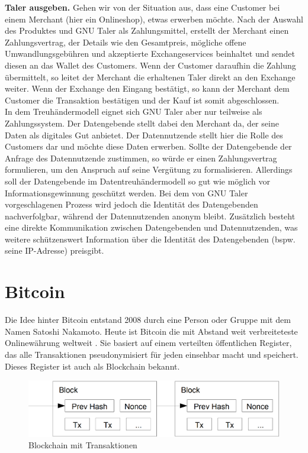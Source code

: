 \documentclass[11pt,a4paper]{scrreprt}
\begin{document}
\textbf{Taler ausgeben.} Gehen wir von der Situation aus, dass eine Customer bei einem Merchant (hier ein Onlineshop), etwas erwerben möchte. Nach der Auswahl des Produktes und GNU Taler als Zahlungsmittel, erstellt der Merchant einen Zahlungsvertrag, der Details wie den Gesamtpreis, mögliche offene Umwandlungsgebühren und akzeptierte Exchangeservices beinhaltet und sendet diesen an das Wallet des Customers.  Wenn der Customer daraufhin die Zahlung übermittelt, so leitet der Merchant die erhaltenen Taler direkt an den Exchange weiter. Wenn der Exchange den Eingang bestätigt, so kann der Merchant dem Customer die Transaktion bestätigen und der Kauf ist somit abgeschlossen.\\


In dem Treuhändermodell eignet sich GNU Taler aber nur teilweise als Zahlungssystem. Der Datengebende stellt dabei den Merchant da, der seine Daten als digitales Gut anbietet. Der Datennutzende stellt hier die Rolle des Customers dar und möchte diese Daten erwerben. Sollte der Datengebende der Anfrage des Datennutzende zustimmen, so würde er einen Zahlungsvertrag formulieren, um den Anspruch auf seine Vergütung zu formalisieren. Allerdings soll der Datengebende im Datentreuhändermodell so gut wie möglich vor Informationsgewinnung geschützt werden. Bei dem von GNU Taler vorgeschlagenen Prozess wird jedoch die Identität des Datengebenden nachverfolgbar, während der Datennutzenden anonym bleibt. Zusätzlich besteht eine direkte Kommunikation zwischen Datengebenden und Datennutzenden, was weitere schützenswert Information über die Identität des Datengebenden (bspw. seine IP-Adresse) preisgibt.

\section{Bitcoin}
\label{sec:bitcoin}
Die Idee hinter Bitcoin entstand 2008 durch eine Person oder Gruppe mit dem Namen Satoshi Nakamoto. Heute ist Bitcoin die mit Abstand weit verbreiteteste Onlinewährung weltweit \cite{btc-beginnerGuide}. Sie basiert auf einem verteilten öffentlichen Register, das alle Transaktionen pseudonymisiert für jeden einsehbar macht und speichert. Dieses Register ist auch als Blockchain bekannt.

\begin{figure}
    \centering
    \label{fig:btc_blockchain}
    \includegraphics[width=0.5\linewidth]{BitcoinBlockchain.png}
    \caption{Blockchain mit Transaktionen \cite{btc-nakamoto2008bitcoin}}
\end{figure}
\end{document}
